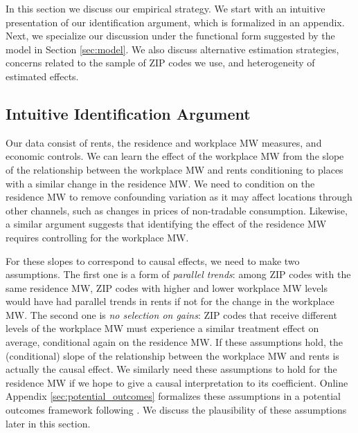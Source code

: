 
In this section we discuss our empirical strategy.
We start with an intuitive presentation of our identification argument, which
is formalized in an appendix.
Next, we specialize our discussion under the functional form suggested by
the model in Section \ref{sec:model}. 
We also discuss alternative estimation strategies, concerns related to
the sample of ZIP codes we use, and heterogeneity of estimated effects.

\subsection{Intuitive Identification Argument}

Our data consist of rents, the residence and workplace MW measures, and 
economic controls.
We can learn the effect of the workplace MW from the slope of the relationship 
between the workplace MW and rents conditioning to places with a similar change 
in the residence MW.
We need to condition on the residence MW to remove confounding variation 
as it may affect locations through other channels, 
such as changes in prices of non-tradable consumption.
Likewise, a similar argument suggests that identifying the effect of the 
residence MW requires controlling for the workplace MW. 

For these slopes to correspond to causal effects, we need to make 
two assumptions.
The first one is a form of \textit{parallel trends}: among ZIP codes with 
the same residence MW, ZIP codes with higher and lower workplace MW levels would 
have had parallel trends in rents if not for the change in the workplace MW.
The second one is \textit{no selection on gains}: ZIP codes that receive
different levels of the workplace MW must experience a similar treatment effect
on average, conditional again on the residence MW.
If these assumptions hold, the (conditional) slope of the relationship between
the workplace MW and rents is actually the causal effect. 
We similarly need these assumptions to hold for the residence MW if we hope 
to give a causal interpretation to its coefficient.
Online Appendix \ref{sec:potential_outcomes} formalizes these assumptions in a 
potential outcomes framework following \textcite{CallawayEtAl2021}.
We discuss the plausibility of these assumptions later in this section.

